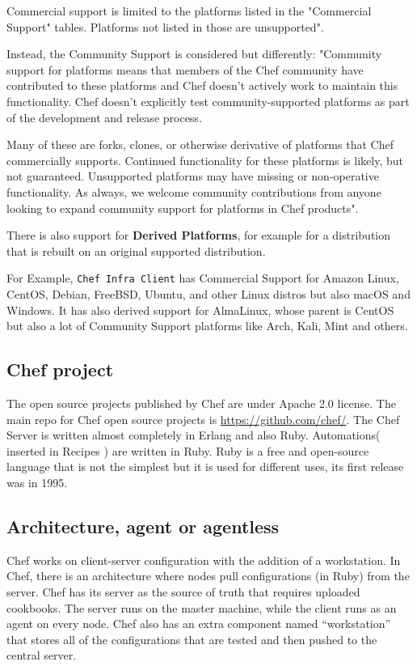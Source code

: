 \documentclass[12pt,a4paper,openright,twoside]{book}
\begin{document}
Commercial support is limited to the platforms listed in the "Commercial Support" tables.
Platforms not listed in those are unsupported"\cite{chefDocPlatforms}.

Instead, the Community Support is considered but differently:
"Community support for platforms means that members of the Chef community have contributed to these platforms and Chef doesn't actively work to maintain this functionality. Chef doesn't explicitly test community-supported platforms as part of the development and release process.

Many of these are forks, clones, or otherwise derivative of platforms that Chef commercially supports.
Continued functionality for these platforms is likely, but not guaranteed.
Unsupported platforms may have missing or non-operative functionality.
As always, we welcome community contributions from anyone
looking to expand community support for platforms in Chef products"\cite{chefDocPlatforms}.


There is also support for \textbf{Derived Platforms}, for example for a distribution that is rebuilt on an original supported distribution.

For Example, \texttt{Chef Infra Client} has Commercial Support for Amazon Linux, CentOS, Debian, FreeBSD, Ubuntu, and other Linux distros but also macOS and Windows.
It has also derived support for AlmaLinux, whose parent is CentOS but also a lot of Community Support platforms like Arch, Kali, Mint and others.

\subsection{Chef project}
The open source projects published by Chef are under Apache 2.0 license.
The main repo for Chef open source projects is \url{https://github.com/chef/}.
The Chef Server is written almost completely in Erlang and also Ruby.
Automations( inserted in Recipes ) are written in Ruby. Ruby is a free and open-source language that is not the simplest but it is used for different uses, its first release was in 1995.

\subsection{Architecture, agent or agentless}
Chef works on client-server configuration with the addition of a workstation.
In Chef, there is an architecture where nodes pull configurations (in Ruby) from the server. Chef has its server as the source of truth that requires uploaded cookbooks.
The server runs on the master machine, while the client runs as an agent on every node. Chef also has an extra component named “workstation” that stores all of the configurations that are tested and then pushed to the central server.
\end{document}
